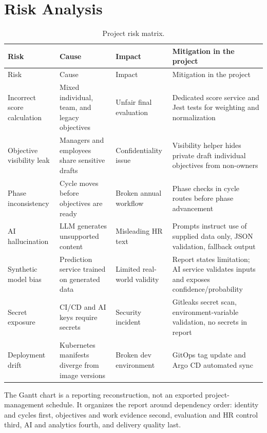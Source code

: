 \section{Risk Analysis}
\begin{longtable}{p{}p{}p{}p{}}
\caption{Project risk matrix.}\label{tab:risk-matrix}\\
\toprule
Risk & Cause & Impact & Mitigation in the project\\
\midrule
\endfirsthead
\toprule
Risk & Cause & Impact & Mitigation in the project\\
\midrule
\endhead
Incorrect score calculation & Mixed individual, team, and legacy objectives & Unfair final evaluation & Dedicated score service and Jest tests for weighting and normalization\\
Objective visibility leak & Managers and employees share sensitive drafts & Confidentiality issue & Visibility helper hides private draft individual objectives from non-owners\\
Phase inconsistency & Cycle moves before objectives are ready & Broken annual workflow & Phase checks in cycle routes before phase advancement\\
AI hallucination & LLM generates unsupported content & Misleading HR text & Prompts instruct use of supplied data only, JSON validation, fallback output\\
Synthetic model bias & Prediction service trained on generated data & Limited real-world validity & Report states limitation; AI service validates inputs and exposes confidence/probability\\
Secret exposure & CI/CD and AI keys require secrets & Security incident & Gitleaks secret scan, environment-variable validation, no secrets in report\\
Deployment drift & Kubernetes manifests diverge from image versions & Broken dev environment & GitOps tag update and Argo CD automated sync\\
\bottomrule
\end{longtable}



The Gantt chart is a reporting reconstruction, not an exported project-management schedule. It organizes the report around dependency order: identity and cycles first, objectives and work evidence second, evaluation and HR control third, AI and analytics fourth, and delivery quality last.

